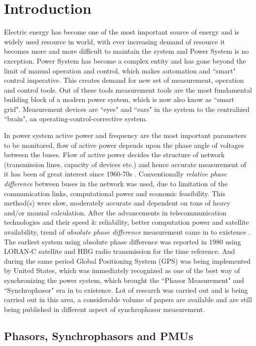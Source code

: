 \chapter{Introduction}
\setcounter{page}{1}

Electric energy has become one of the most important source of energy and is widely used resource in world, with ever increasing demand of resource it becomes more and more difficult to maintain the system and Power System is no exception. Power System has become a complex entity and has gone beyond the limit of manual operation and control, which makes automation and ``smart" control imperative. This creates demand for new set of measurement, operation and control tools. Out of these tools measurement tools are the most fundamental building block of a modern power system, which is now also know as ``smart grid". Measurement devices are ``eyes" and ``ears" in the system to the centralized ``brain", an operating-control-corrective system.  

In power system active power and frequency are the most important parameters to be monitored, flow of active power depends upon the phase angle of voltages between the buses. Flow of active power decides the structure of network (transmission lines, capacity of devices etc.) and hence accurate measurement of it has been of great interest since 1960-70s \cite{agphadkebook}. Conventionally \textit{relative phase difference} between buses in the network was used, due to limitation of the communication links, computational power and  economic feasibility. This method(s) were slow, moderately accurate and dependent on tons of heavy and/or manual calculation. 
After the advancements in telecommunication technologies and their speed \& reliability, better computation power and satellite availability, trend of \textit{absolute phase difference} measurement came in to existence \cite{PMUhist}. The earliest system using absolute phase difference was reported in 1980 using LORAN-C satellite and HBG radio transmission for the time reference. And during the same period Global Positioning System (GPS) was being implemented by United States, which was immediately recognized as one of the best way of synchronizing the power system, which brought the ``Phasor Measurement" and ``Synchrophasor" era in to existence. Lot of research was carried out and is being carried out in this area, a considerable volume of papers are available and are still being published in different aspect of synchrophasor measurement.
\section{Phasors, Synchrophasors and PMUs}
